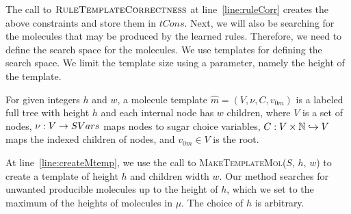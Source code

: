 The call to $\textsc{RuleTemplateCorrectness}$ at
line~\ref{line:ruleCorr} creates the above constraints
and store them in $tCons$.
Next, we will also be searching for the molecules that may be produced by the learned rules.
Therefore, we need to define the search space for the molecules.
We use templates for defining the search space.
We limit the template size using a parameter,
namely the height of the template.
\begin{df}
For given integers $h$ and $w$,
a {molecule template} $\hat{m} = (V, \nu, C, v_{0m})$ is a labeled full tree with height $h$ and 
each internal node has $w$ children, where 
$V$ is a set of nodes, $\nu : V \rightarrow SVars$ maps nodes to sugar choice variables,
$C : V \times \mathbb{N} \hookrightarrow V$ maps the indexed children of nodes,
and
$v_{0m} \in V$ is the root.
\end{df}
At line~\ref{line:createMtemp}, we use the call to \textsc{MakeTemplateMol}($S$, $h$, $w$) to
create a template of height $h$ and children width $w$.
%
Our method searches for unwanted producible molecules up to the height of $h$,
which we set to the maximum of the heights of molecules in $\mu$.
%
The choice of $h$ is arbitrary.

